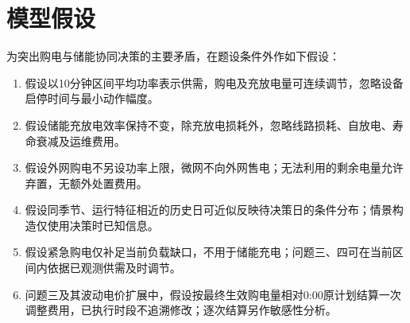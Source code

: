 \section{模型假设}
\label{sec:frontmatter-assumptions}

为突出购电与储能协同决策的主要矛盾，在题设条件外作如下假设：

\begin{enumerate}
  \item 假设以10分钟区间平均功率表示供需，购电及充放电量可连续调节，忽略设备启停时间与最小动作幅度。
  \item 假设储能充放电效率保持不变，除充放电损耗外，忽略线路损耗、自放电、寿命衰减及运维费用。
  \item 假设外网购电不另设功率上限，微网不向外网售电；无法利用的剩余电量允许弃置，无额外处置费用。
  \item 假设同季节、运行特征相近的历史日可近似反映待决策日的条件分布；情景构造仅使用决策时已知信息。
  \item 假设紧急购电仅补足当前负载缺口，不用于储能充电；问题三、四可在当前区间内依据已观测供需及时调节。
  \item 问题三及其波动电价扩展中，假设按最终生效购电量相对0:00原计划结算一次调整费用，已执行时段不追溯修改；逐次结算另作敏感性分析。
\end{enumerate}

